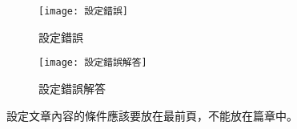 \begin{figure}[ht]
  \begin{minipage}{0.5\textwidth}
    \centering
    \texttt{[image: 設定錯誤]}
    \caption{設定錯誤}
  \end{minipage}%
  \begin{minipage}{0.5\textwidth}
    \centering
    \texttt{[image: 設定錯誤解答]}
    \caption{設定錯誤解答}
  \end{minipage}
\end{figure}
設定文章內容的條件應該要放在最前頁，不能放在篇章中。
\newpage
